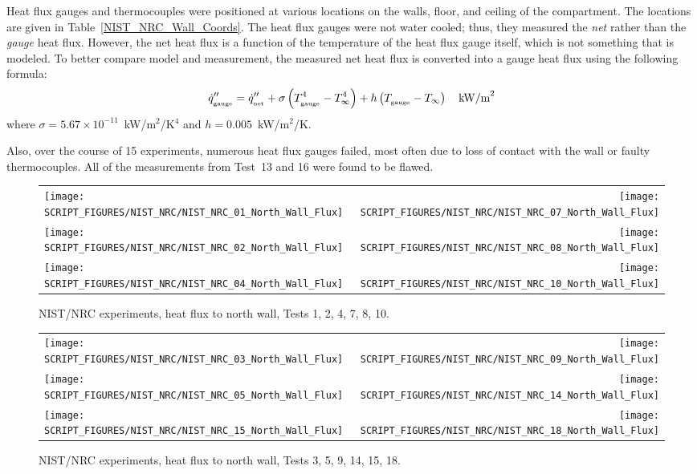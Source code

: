 Heat flux gauges and thermocouples were positioned at various locations on the walls, floor, and ceiling of the compartment. The locations are given in Table~\ref{NIST_NRC_Wall_Coords}. The heat flux gauges were not water cooled; thus, they measured the {\em net} rather than the {\em gauge} heat flux. However, the net heat flux is a function of the temperature of the heat flux gauge itself, which is not something that is modeled. To better compare model and measurement, the measured net heat flux is converted into a gauge heat flux using the following formula:
\begin{equation}
\dot{q}''_{_{\textrm{\tiny gauge}}} = \dot{q}''_{_{\textrm{\tiny net}}} + \sigma \left( T^4_{_{\textrm{\tiny gauge}}} - T^4_\infty \right) + h  \left( T_{_{\textrm{\tiny gauge}}}-T_\infty \right) \quad \hbox{kW/m}^2
\end{equation}
where $\sigma=5.67 \times 10^{-11}$~kW/m$^2$/K$^4$ and $h=0.005$~kW/m$^2$/K.

Also, over the course of 15 experiments, numerous heat flux gauges failed, most often due to loss of contact with the wall or faulty thermocouples. All of the measurements from Test~13 and 16 were found to be flawed.

\newpage

\begin{figure}[p]
\begin{tabular*}{\textwidth}{l@{\extracolsep{\fill}}r}
\texttt{[image: SCRIPT\_FIGURES/NIST\_NRC/NIST\_NRC\_01\_North\_Wall\_Flux]} &
\texttt{[image: SCRIPT\_FIGURES/NIST\_NRC/NIST\_NRC\_07\_North\_Wall\_Flux]} \\
\texttt{[image: SCRIPT\_FIGURES/NIST\_NRC/NIST\_NRC\_02\_North\_Wall\_Flux]} &
\texttt{[image: SCRIPT\_FIGURES/NIST\_NRC/NIST\_NRC\_08\_North\_Wall\_Flux]} \\
\texttt{[image: SCRIPT\_FIGURES/NIST\_NRC/NIST\_NRC\_04\_North\_Wall\_Flux]} &
\texttt{[image: SCRIPT\_FIGURES/NIST\_NRC/NIST\_NRC\_10\_North\_Wall\_Flux]}
\end{tabular*}
\caption[NIST/NRC experiments, heat flux to north wall, Tests 1, 2, 4, 7, 8, 10]{NIST/NRC experiments, heat flux to north wall, Tests 1, 2, 4, 7, 8, 10.}
\label{NIST_NRC_North_Wall_Flux_Closed}
\end{figure}

\begin{figure}[p]
\begin{tabular*}{\textwidth}{l@{\extracolsep{\fill}}r}
\texttt{[image: SCRIPT\_FIGURES/NIST\_NRC/NIST\_NRC\_03\_North\_Wall\_Flux]} &
\texttt{[image: SCRIPT\_FIGURES/NIST\_NRC/NIST\_NRC\_09\_North\_Wall\_Flux]} \\
\texttt{[image: SCRIPT\_FIGURES/NIST\_NRC/NIST\_NRC\_05\_North\_Wall\_Flux]} &
\texttt{[image: SCRIPT\_FIGURES/NIST\_NRC/NIST\_NRC\_14\_North\_Wall\_Flux]} \\
\texttt{[image: SCRIPT\_FIGURES/NIST\_NRC/NIST\_NRC\_15\_North\_Wall\_Flux]} &
\texttt{[image: SCRIPT\_FIGURES/NIST\_NRC/NIST\_NRC\_18\_North\_Wall\_Flux]}
\end{tabular*}
\caption[NIST/NRC experiments, heat flux to north wall, Tests 3, 5, 9, 14, 15, 18]{NIST/NRC experiments, heat flux to north wall, Tests 3, 5, 9, 14, 15, 18.}
\label{NIST_NRC_North_Wall_Flux_Open}
\end{figure}

